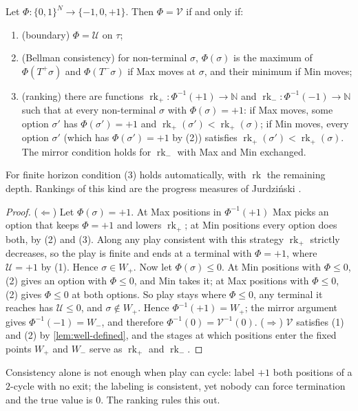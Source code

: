 \documentclass[final]{siamart0516}
\numberwithin{theorem}{section}
\numberwithin{equation}{section}
\theoremstyle{siamnonum}
\theoremstyle{plain}
\newcommand{\NN}{\mathbb{N}}
\newcommand{\val}{\mathcal{V}}            %
\newcommand{\pay}{\mathcal{U}}            %
\newcommand{\rk}{\operatorname{rk}}
\begin{document}
\begin{theorem}\label{thm:local}
Let $\Phi\colon\{0,1\}^N\to\{-1,0,+1\}$. Then $\Phi=\val$ if and only if:
\begin{enumerate}[label=\textup{(\arabic*)}]
\item \textup{(boundary)} $\Phi=\pay$ on $\tau$;
\item \textup{(Bellman consistency)} for non-terminal $\sigma$, $\Phi(\sigma)$ is the maximum of $\Phi(T^{+}\sigma)$ and $\Phi(T^{-}\sigma)$ if Max moves at $\sigma$, and their minimum if Min moves;
\item \textup{(ranking)} there are functions $\rk_{+}\colon\Phi^{-1}(+1)\to\NN$ and $\rk_{-}\colon\Phi^{-1}(-1)\to\NN$ such that at every non-terminal $\sigma$ with $\Phi(\sigma)=+1$: if Max moves, some option $\sigma'$ has $\Phi(\sigma')=+1$ and $\rk_{+}(\sigma')<\rk_{+}(\sigma)$; if Min moves, every option $\sigma'$ \textup{(}which has $\Phi(\sigma')=+1$ by \textup{(2)}\textup{)} satisfies $\rk_{+}(\sigma')<\rk_{+}(\sigma)$. The mirror condition holds for $\rk_{-}$ with Max and Min exchanged.
\end{enumerate}
For finite horizon condition \textup{(3)} holds automatically, with $\rk$ the remaining depth. Rankings of this kind are the progress measures of Jurdzi\'nski \cite{Jurdzinski}.
\end{theorem}

\begin{proof}
($\Leftarrow$) Let $\Phi(\sigma)=+1$. At Max positions in $\Phi^{-1}(+1)$ Max picks an option that keeps $\Phi=+1$ and lowers $\rk_{+}$; at Min positions every option does both, by (2) and (3). Along any play consistent with this strategy $\rk_{+}$ strictly decreases, so the play is finite and ends at a terminal with $\Phi=+1$, where $\pay=+1$ by (1). Hence $\sigma\in W_{+}$.
Now let $\Phi(\sigma)\le 0$. At Min positions with $\Phi\le0$, (2) gives an option with $\Phi\le 0$, and Min takes it; at Max positions with $\Phi\le0$, (2) gives $\Phi\le 0$ at both options. So play stays where $\Phi\le 0$, any terminal it reaches has $\pay\le 0$, and $\sigma\notin W_{+}$. Hence $\Phi^{-1}(+1)=W_{+}$; the mirror argument gives $\Phi^{-1}(-1)=W_{-}$, and therefore $\Phi^{-1}(0)=\val^{-1}(0)$.
($\Rightarrow$) $\val$ satisfies (1) and (2) by \cref{lem:well-defined}, and the stages at which positions enter the fixed points $W_{+}$ and $W_{-}$ serve as $\rk_{+}$ and $\rk_{-}$.
\end{proof}

Consistency alone is not enough when play can cycle: label $+1$ both positions of a $2$-cycle with no exit; the labeling is consistent, yet nobody can force termination and the true value is $0$. The ranking rules this out.
\end{document}
